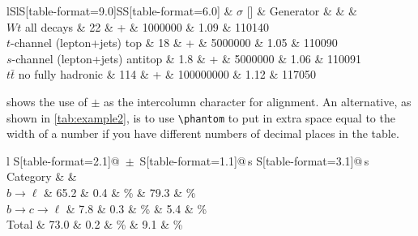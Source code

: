 \documentclass[REPORT=false, UKenglish]{atlasdoc}
\begin{document}
\begin{table}[htbp]
\begin{tcblisting}{}
  \caption{Top quark event MC samples used for this analysis. The cross-section column includes \(k\)-factors and branching ratios.}%
  \label{tab:mcsamples}
  \centering
  \renewcommand{\arraystretch}{1.2}
  \scriptsize
  \begin{tabular}{lSlS[table-format=9.0]SS[table-format=6.0]}
    \toprule
      & {\(\sigma\) [\unit{\pb}]} & Generator
      &  &  & \\
    \midrule
    \(Wt\) all decays                   &  22  & \POWHEG + \PYTHIA &   1000000  & 1.09 & 110140\\
    \(t\)-channel (lepton+jets) top     &  18  & \POWHEG + \PYTHIA &   5000000  & 1.05 & 110090\\
    \(s\)-channel (lepton+jets) antitop &  1.8 & \POWHEG + \PYTHIA &   5000000  & 1.06 & 110091\\
    \(t\bar{t}\) no fully hadronic      & 114  & \POWHEG + \PYTHIA & 100000000  & 1.12 & 117050\\
    \bottomrule
  \end{tabular}
\end{tcblisting}
\end{table}

 shows the use of \(\pm\) as the intercolumn
character for alignment. An alternative, as shown in
\cref{tab:example2}, is to use \verb+\phantom+ to put in extra
space equal to the width of a number if you have different numbers of
decimal places in the table.


\begin{table}[htbp]
\begin{tcblisting}{}
  \caption[Monte Carlo purities in the single lepton sample]{%
    Monte Carlo estimates of the fraction of each process in the single
    lepton data sample. This table uses ``S'' format from \texttt{siunitx} and
    ``\texttt{\(\,\pm\,\)}'' as the intercolumn separator.}%
  \label{tab:example1}
  \centering
  \begin{tabular}{l S[table-format=2.1]@{\(\;\pm\;\)}S[table-format=1.1]@{\,}s
    S[table-format=3.1]@{\,}s}
    \toprule
    Category             &  & \\
    \midrule
    \(b \to \ell\)       &     65.2 & 0.4 & \%   &  79.3 & \% \\
    \(b \to c \to \ell\) &      7.8 & 0.3 & \%   &   5.4 & \% \\
    Total                &     73.0 & 0.2 & \%   &   9.1 & \% \\
    \bottomrule
  \end{tabular}
\end{tcblisting}
\end{table}
\end{document}
